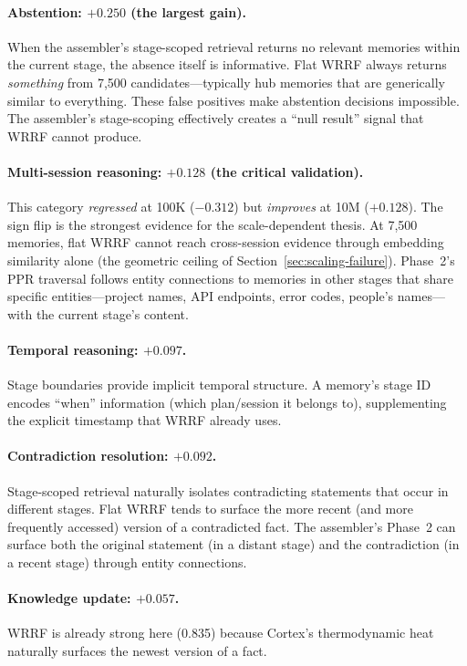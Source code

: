 \documentclass[11pt]{article}
\begin{document}
\paragraph{Abstention: $+0.250$ (the largest gain).}
When the assembler's stage-scoped retrieval returns no relevant
memories within the current stage, the absence itself is informative.
Flat WRRF always returns \emph{something} from 7,500
candidates---typically hub memories that are generically similar to
everything.  These false positives make abstention decisions
impossible.  The assembler's stage-scoping effectively creates a
``null result'' signal that WRRF cannot produce.

\paragraph{Multi-session reasoning: $+0.128$ (the critical validation).}
This category \emph{regressed} at 100K ($-0.312$) but \emph{improves}
at 10M ($+0.128$).  The sign flip is the strongest evidence for the
scale-dependent thesis.  At 7,500 memories, flat WRRF cannot reach
cross-session evidence through embedding similarity alone (the
geometric ceiling of Section~\ref{sec:scaling-failure}).  Phase~2's
PPR traversal follows entity connections to memories in other stages
that share specific entities---project names, API endpoints, error
codes, people's names---with the current stage's content.

\paragraph{Temporal reasoning: $+0.097$.}
Stage boundaries provide implicit temporal structure.  A memory's
stage ID encodes ``when'' information (which plan/session it belongs
to), supplementing the explicit timestamp that WRRF already uses.

\paragraph{Contradiction resolution: $+0.092$.}
Stage-scoped retrieval naturally isolates contradicting statements
that occur in different stages.  Flat WRRF tends to surface the more
recent (and more frequently accessed) version of a contradicted fact.
The assembler's Phase~2 can surface both the original statement (in
a distant stage) and the contradiction (in a recent stage) through
entity connections.

\paragraph{Knowledge update: $+0.057$.}
WRRF is already strong here (0.835) because Cortex's thermodynamic
heat naturally surfaces the newest version of a fact.
\end{document}
